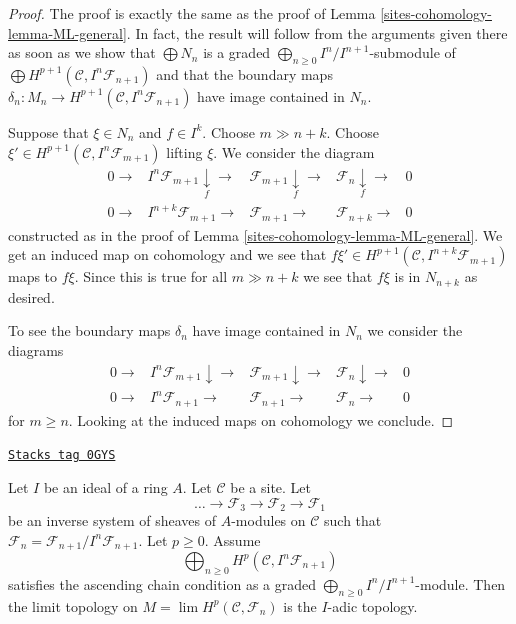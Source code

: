 \begin{proof}
The proof is exactly the same as the proof of Lemma \ref{sites-cohomology-lemma-ML-general}.
In fact, the result will follow from the arguments given there
as soon as we show that
$\bigoplus N_n$ is a graded $\bigoplus_{n \geq 0} I^n/I^{n + 1}$-submodule
of $\bigoplus H^{p + 1}(\mathcal{C}, I^n\mathcal{F}_{n + 1})$
and that the boundary maps
$\delta_n : M_n \to H^{p + 1}(\mathcal{C}, I^n\mathcal{F}_{n + 1})$
have image contained in $N_n$.

\medskip\noindent
Suppose that $\xi \in N_n$ and $f \in I^k$.
Choose $m \gg n + k$. Choose
$\xi' \in H^{p + 1}(\mathcal{C}, I^n\mathcal{F}_{m + 1})$ lifting
$\xi$. We consider the diagram
$$
\begin{array}{ccccc}0 \longrightarrow & I^n\mathcal{F}_{m + 1} \underset{f}{\downarrow}\longrightarrow & \mathcal{F}_{m + 1} \underset{f}{\downarrow}\longrightarrow & \mathcal{F}_n \underset{f}{\downarrow}\longrightarrow & 0 \\ 0 \longrightarrow & I^{n + k}\mathcal{F}_{m + 1} \longrightarrow & \mathcal{F}_{m + 1} \longrightarrow & \mathcal{F}_{n + k} \longrightarrow & 0\end{array}
$$
constructed as in the proof of Lemma \ref{sites-cohomology-lemma-ML-general}.
We get an induced map on cohomology and we see that
$f \xi' \in H^{p + 1}(\mathcal{C}, I^{n + k}\mathcal{F}_{m + 1})$
maps to $f \xi$. Since this is true for all $m \gg n + k$
we see that $f\xi$ is in $N_{n + k}$ as desired.

\medskip\noindent
To see the boundary maps $\delta_n$ have image contained in $N_n$
we consider the diagrams
$$
\begin{array}{ccccc}0 \longrightarrow & I^n\mathcal{F}_{m + 1} \downarrow\longrightarrow & \mathcal{F}_{m + 1} \downarrow\longrightarrow & \mathcal{F}_n \downarrow\longrightarrow & 0 \\ 0 \longrightarrow & I^n\mathcal{F}_{n + 1} \longrightarrow & \mathcal{F}_{n + 1} \longrightarrow & \mathcal{F}_n \longrightarrow & 0\end{array}
$$
for $m \geq n$. Looking at the induced maps on cohomology we conclude.
\end{proof}

\begin{lemma}
\label{sites-cohomology-lemma-topology-I-adic-general}
\href{https://stacks.math.columbia.edu/tag/0GYS}{\texttt{Stacks tag 0GYS}}

Let $I$ be an ideal of a ring $A$. Let $\mathcal{C}$ be a site. Let
$$
\ldots \to \mathcal{F}_3 \to \mathcal{F}_2 \to \mathcal{F}_1
$$
be an inverse system of sheaves of $A$-modules on $\mathcal{C}$ such that
$\mathcal{F}_n = \mathcal{F}_{n + 1}/I^n\mathcal{F}_{n + 1}$.
Let $p \geq 0$. Assume
$$
\bigoplus\nolimits_{n \geq 0} H^p(\mathcal{C}, I^n\mathcal{F}_{n + 1})
$$
satisfies the ascending chain condition as a graded
$\bigoplus_{n \geq 0} I^n/I^{n + 1}$-module.
Then the limit topology on $M = \lim H^p(\mathcal{C}, \mathcal{F}_n)$
is the $I$-adic topology.
\end{lemma}

